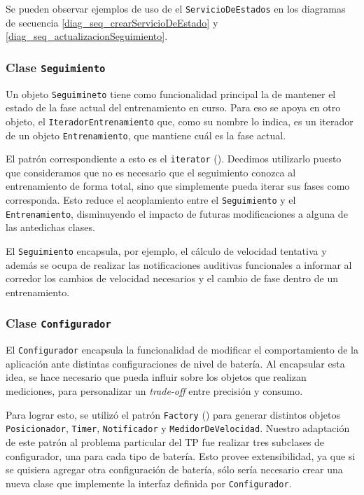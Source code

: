 \documentclass[10pt, a4paper,english,spanish]{article}
\begin{document}
Se pueden observar ejemplos de uso de el \texttt{ServicioDeEstados} en los diagramas de secuencia \ref{diag_seq_crearServicioDeEstado} y \ref{diag_seq_actualizacionSeguimiento}. 

\subsubsection{Clase \texttt{Seguimiento}}
Un objeto \texttt{Seguimineto} tiene como funcionalidad principal la de mantener el estado de la fase actual del entrenamiento en curso. Para eso se apoya en otro objeto, el \texttt{IteradorEntrenamiento} que, como su nombre lo indica, es un iterador de un objeto \texttt{Entrenamiento}, que mantiene cuál es la fase actual. 

El patrón correspondiente a esto es el \texttt{iterator} (\cite{Gamma}). Decdimos utilizarlo puesto que consideramos que no es necesario que el seguimiento conozca al entrenamiento de forma total, sino que simplemente pueda iterar sus fases como corresponda. Esto reduce el acoplamiento entre el \texttt{Seguimiento} y el \texttt{Entrenamiento}, disminuyendo el impacto de futuras modificaciones a alguna de las antedichas clases.

El \texttt{Seguimiento} encapsula, por ejemplo, el cálculo de velocidad tentativa y además se ocupa de realizar las notificaciones auditivas funcionales a informar al corredor los cambios de velocidad necesarios y el cambio de fase dentro de un entrenamiento.

\subsubsection{Clase \texttt{Configurador}}
El \texttt{Configurador} encapsula la funcionalidad de modificar el comportamiento de la aplicación ante distintas configuraciones de nivel de batería. Al encapsular esta idea, se hace necesario que pueda influir sobre los objetos que realizan mediciones, para personalizar un \emph{trade-off} entre precisión y consumo. 

Para lograr esto, se utilizó el patrón \texttt{Factory} (\cite{Gamma}) para generar distintos objetos \texttt{Posicionador}, \texttt{Timer}, \texttt{Notificador} y \texttt{MedidorDeVelocidad}. Nuestro adaptación de este patrón al problema particular del TP fue realizar tres subclases de configurador, una para cada tipo de batería. Esto provee extensibilidad, ya que si se quisiera agregar otra configuración de batería, sólo sería necesario crear una nueva clase que implemente la interfaz definida por \texttt{Configurador}. 
\end{document}
